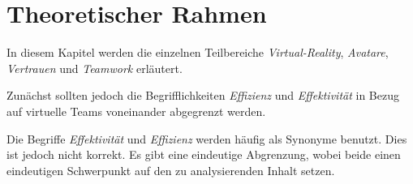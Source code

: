 \documentclass[a4paper,11pt]{article}%
\renewcommand{\\}{\vspace*{0.5\baselineskip} \newline}
\begin{document}
%
%
%
%

	\newpage
\section{Theoretischer Rahmen}

In diesem Kapitel werden die einzelnen Teilbereiche \textit{Virtual-Reality}, \textit{Avatare}, \textit{Vertrauen} und \textit{Teamwork} erläutert.

Zunächst sollten jedoch die Begrifflichkeiten \textit{Effizienz} und \textit{Effektivität} in Bezug auf virtuelle Teams voneinander abgegrenzt werden.

Die Begriffe \textit{Effektivität} und \textit{Effizienz} werden häufig als Synonyme benutzt. Dies ist jedoch nicht korrekt. Es gibt eine eindeutige Abgrenzung, wobei beide einen eindeutigen Schwerpunkt auf den zu analysierenden Inhalt setzen.

\end{document}
